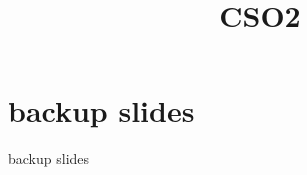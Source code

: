 \date{}
\title{CSO2}
\date{}

\begin{frame}
    \titlepage
\end{frame}






\section{backup slides}
\begin{frame}{backup slides}
\end{frame}


